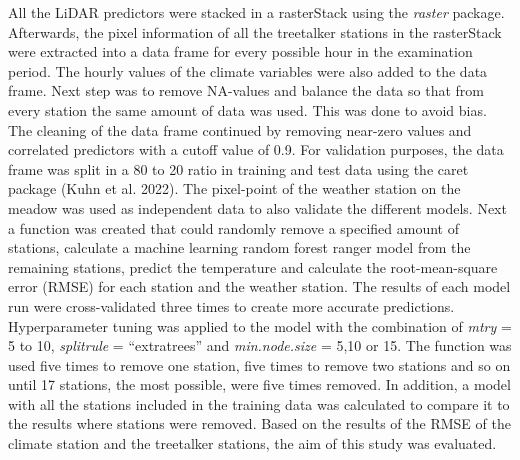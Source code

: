 \documentclass[5p]{elsarticle} %
\begin{document}
All the LiDAR predictors were stacked in a rasterStack using the \emph{raster} package. Afterwards, the pixel information of all the treetalker stations in the rasterStack were extracted into a data frame for every possible hour in the examination period. The hourly values of the climate variables were also added to the data frame. Next step was to remove NA-values and balance the data so that from every station the same amount of data was used. This was done to avoid bias. The cleaning of the data frame continued by removing near-zero values and correlated predictors with a cutoff value of 0.9. 
For validation purposes, the data frame was split in a 80 to 20 ratio in training and test data using the caret package (Kuhn et al. 2022). The pixel-point of the weather station on the meadow was used as independent data to also validate the different models. Next a function was created that could randomly remove a specified amount of stations, calculate a machine learning random forest ranger model from the remaining stations, predict the temperature and calculate the root-mean-square error (RMSE) for each station and the weather station. The results of each model run were cross-validated three times to create more accurate predictions. Hyperparameter tuning was applied to the model with the combination of \emph{mtry} = 5 to 10, \emph{splitrule} = “extratrees” and \emph{min.node.size} = 5,10 or 15. The function was used five times to remove one station, five times to remove two stations and so on until 17 stations, the most possible, were five times removed. In addition, a model with all the stations included in the training data was calculated to compare it to the results where stations were removed. Based on the results of the RMSE of the climate station and the treetalker stations, the aim of this study was evaluated. 
\end{document}
